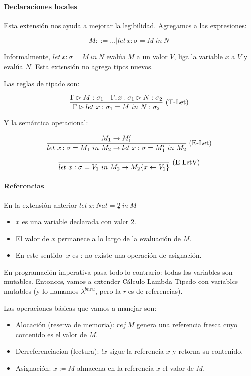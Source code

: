 \paragraph{Declaraciones locales}

Esta extensión nos ayuda a mejorar la legibilidad. Agregamos a las expresiones:

\[M ::= \dots \vert let\ x : \sigma = M\ in\ N\]

Informalmente, $let\ x : \sigma = M\ in\ N$ evalúa $M$ a un valor $V$, liga la variable $x$ a $V$ y evalúa $N$.
Esta extensión no agrega tipos nuevos.

Las reglas de tipado son:

\[\frac{\Gamma \rhd M : \sigma_1\quad \Gamma, x: \sigma_1 \rhd N : \sigma_2}{\Gamma \rhd let\ x : \sigma_1 = M\ in\ N : \sigma_2}\ \text{(T-Let)}\]

Y la semántica operacional:

\[\frac{M_1 \to M_1'}{let\ x : \sigma = M_1\ in\ M_2 \to let\ x : \sigma = M_1'\ in\ M_2}\ \text{(E-Let)}\]

\[\frac{}{let\ x : \sigma = V_1\ in\ M_2 \to M_2\{x \leftarrow V_1\}}\ \text{(E-LetV)}\]

\paragraph{Referencias}

En la extensión anterior $let\ x : Nat = \underline{2}\ in\ M$
\begin{itemize}
  \item $x$ es una variable declarada con valor 2.
  \item El valor de $x$ permanece  a lo largo de la evaluación de $M$.
  \item En este sentido, $x$ es : no existe una operación de asignación.
\end{itemize}

En programación imperativa pasa todo lo contrario: todas las variables son mutables.
Entonces, vamos a extender Cálculo Lambda Tipado con variables mutables (y lo llamamos $\lambda^{bnru}$, pero la $r$ es de referencias).

Las operaciones básicas que vamos a manejar son:
\begin{itemize}
  \item Alocación (reserva de memoria): $ref\ M$ genera una referencia fresca cuyo contenido es el valor de $M$.
  \item Derreferenciación (lectura): $!x$ sigue la referencia $x$ y retorna su contenido.
  \item Asignación: $x := M$ almacena en la referencia $x$ el valor de $M$.
\end{itemize}


